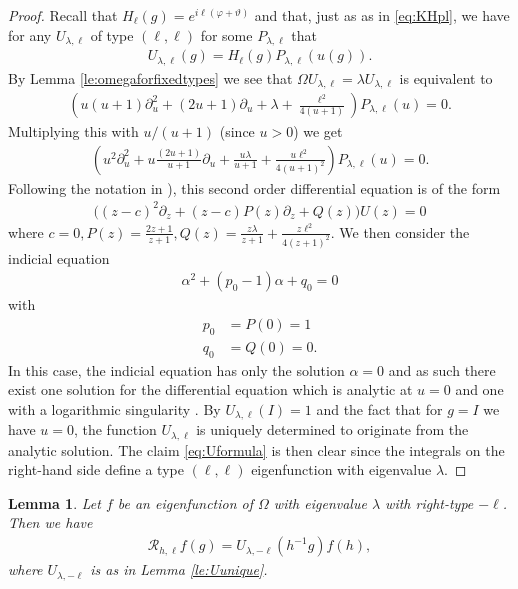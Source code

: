 \documentclass[12pt]{amsart}
\newtheorem{lemma}[theorem]{Lemma}
\theoremstyle{definition}
\theoremstyle{remark}
\numberwithin{equation}{section}
\newcommand{\1}{{\mathbf 1}}
\begin{document}
\begin{proof}
Recall that $H_\ell(g)=e^{i\ell (\varphi+\vartheta)}$ and that, just as as in \eqref{eq:KHpl}, we have for any $U_{\lambda,\ell}$ of type $(\ell,\ell)$ for some $P_{\lambda,\ell}$ that
\begin{align*}
    U_{\lambda,\ell}(g)=H_\ell(g)P_{\lambda,\ell}(u(g)).
\end{align*}
By Lemma \ref{le:omegaforfixedtypes} we see that $\Omega U_{\lambda,\ell}=\lambda U_{\lambda,\ell}$ is equivalent to 
\begin{align*}
(u(u+1) \partial_u^2 + (2u+1) \partial_u + \lambda +\frac{\ell^2}{4(u+1)}) P_{\lambda,\ell}(u) = 0.
\end{align*}
Multiplying this with $u/(u+1)$ (since $u > 0$) we get
\begin{align*}
    (u^2 \partial_u^2 + u\frac{(2u+1)}{u+1}\partial_u +\frac{u \lambda}{u+1} +\frac{u \ell^2}{4(u+1)^2})  P_{\lambda,\ell}(u)=0.
\end{align*}
Following the notation in \cite[Section 10.3]{whittakerwatson}), this second order differential equation is of the form 
\begin{align*}
   \bigg( (z-c)^2 \partial_z + (z-c) P(z) \partial_z + Q(z)\bigg) U(z) = 0
\end{align*}
where $c=0, P(z) = \frac{2z+1}{z+1}, Q(z) =\frac{z \lambda}{z+1} +\frac{z \ell^2}{4(z+1)^2} $. We then consider the indicial equation
\begin{align*}
    \alpha^2+(p_0-1)\alpha+q_0=0
\end{align*}
with
\begin{align*}
    p_0&=P(0)=1\\
    q_0&=Q(0)=0.
\end{align*}
In this case, the indicial equation has only the solution $\alpha=0$ and as such there exist one solution for the differential equation which is analytic at $u=0$ and one with a logarithmic singularity \cite[Section 10.32]{whittakerwatson}. By $U_{\lambda,\ell}(I)=1$ and the fact that for $g=I$ we have $u=0$, the function $U_{\lambda,\ell}$ is uniquely determined to originate from the analytic solution. The claim \eqref{eq:Uformula} is then clear since the integrals on the right-hand side define a type $(\ell,\ell)$ eigenfunction with eigenvalue $\lambda$. 
\end{proof}


\begin{lemma} \label{le:fhtoU}
Let $f$ be an eigenfunction of $\Omega$ with eigenvalue $\lambda$ with right-type $-\ell$. Then we have
    \begin{align*}
\mathcal{R}_{h,\ell}f(g) = U_{\lambda,-\ell}(h^{-1} g ) f(h),
    \end{align*}
    where $U_{\lambda,-\ell}$ is as in Lemma \ref{le:Uunique}.
\end{lemma}
\end{document}
